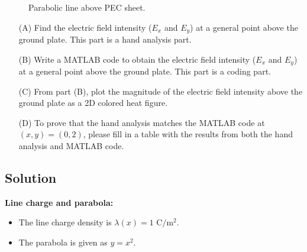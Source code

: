 \documentclass[14pt]{article}
\newcommand*{\nsubsection}[1]{
    \subsection*{#1}
    \addcontentsline{toc}{subsection}{#1}
}
\begin{document}
\begin{figure}[ht]
  \centering
  \caption{Parabolic line above PEC sheet.}
\end{figure}


\begin{enumerate}
    \item[(A)] Find the electric field intensity (\(E_x\) and \(E_y\)) at a general point above the ground plate. This part is a hand analysis part.
    \item[(B)] Write a MATLAB code to obtain the electric field intensity (\(E_x\) and \(E_y\)) at a general point above the ground plate. This part is a coding part.
    \item[(C)] From part (B), plot the magnitude of the electric field intensity above the ground plate as a 2D colored heat figure.
    \item[(D)] To prove that the hand analysis matches the MATLAB code at \((x, y) = (0, 2)\), please fill in a table with the results from both the hand analysis and MATLAB code.
\end{enumerate}

\nsubsection{Solution}

\noindent\textbf{Line charge and parabola:}
\begin{itemize}
    \item The line charge density is $\lambda(x) = 1\text{ C}/\text{m}^2$.
    \item The parabola is given as $y = x^2$.
\end{itemize}
\end{document}
